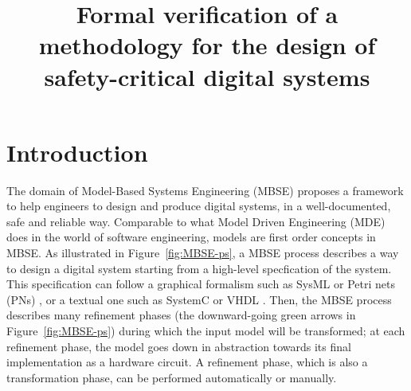 \documentclass[pdflatex,sn-mathphys]{sn-jnl}%
\theoremstyle{thmstyleone}%
\theoremstyle{thmstyletwo}%
\theoremstyle{thmstylethree}%
\begin{document}
\title[Formal verification of the \hilecop{} methodology]{Formal
  verification of a methodology for the design of safety-critical
  digital systems}


\author*[1]{ }
\author[1]{ }
\author[1,2]{ }




\abstract{}

\keywords{}

\maketitle

\listoftodos

\section{Introduction}
\label{sec:intro}

The domain of Model-Based Systems Engineering (MBSE) \cite{Long2011}
proposes a framework to help engineers to design and produce digital
systems, in a well-documented, safe and reliable way. Comparable to
what Model Driven Engineering (MDE) does in the world of software
engineering, models are first order concepts in MBSE.  As illustrated
in Figure~\ref{fig:MBSE-ps}, a MBSE process describes a way to design
a digital system starting from a high-level specfication of the
system. This specification can follow a graphical formalism such as
SysML \cite{Friedenthal2014} or Petri nets (PNs) \cite{Petri1962}, or
a textual one such as SystemC \cite{Black2009} or VHDL
\cite{Ashenden2010}. Then, the MBSE process describes many refinement
phases (the downward-going green arrows in Figure~\ref{fig:MBSE-ps})
during which the input model will be transformed; at each refinement
phase, the model goes down in abstraction towards its final
implementation as a hardware circuit. A refinement phase, which is
also a transformation phase, can be performed automatically or
manually.
\end{document}
